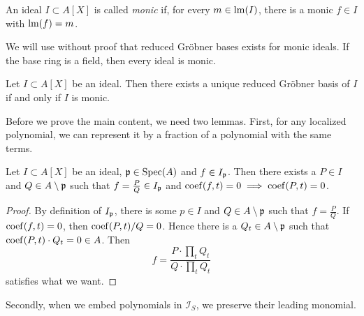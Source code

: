 \begin{definition}
  An ideal $I \subset A[X]$ is called \textit{monic} if, for every $m \in \operatorname{lm}(I)$, there is a monic $f \in I$ with $\operatorname{lm}(f) = m$.
\end{definition}

We will use without proof that reduced Gröbner bases exists for monic ideals. If the base ring is a field, then every ideal is monic.

\begin{proposition}\label{prop:exi!_red_grb}
  Let $I \subset A[X]$ be an ideal. Then there exists a unique reduced Gröbner basis of $I$ if and only if $I$ is monic.
\end{proposition}

Before we prove the main content, we need two lemmas. First, for any localized polynomial, we can represent it by a fraction of a polynomial with the same terms.

\begin{lemma}\label{lem:local_poly_rep}
  Let $I \subset A[X]$ be an ideal, $\mathfrak p \in \operatorname{Spec}(A)$ and $f \in I_{\mathfrak p}$. Then there exists a $P \in I$ and $Q \in A \setminus \mathfrak p$ such that $f = \frac P Q \in I_{\mathfrak p}$ and $\operatorname{coef}(f, t) = 0 \implies \operatorname{coef}(P, t) = 0$.
\end{lemma}
\begin{proof}
  By definition of $I_{\mathfrak p}$, there is some $p \in I$ and $Q \in A \setminus \mathfrak p$ such that $f = \frac P Q$. If $\operatorname{coef}(f, t) = 0$, then $\operatorname{coef}(P, t)/Q = 0$. Hence there is a $Q_{t} \in A \setminus \mathfrak p$ such that $\operatorname{coef}(P, t)\cdot Q_{t} = 0 \in A$. Then
  \[f = \frac{P \cdot \prod_{t}Q_{t}}{Q \cdot \prod_{t}Q_{t}}\] satisfies what we want.
\end{proof}

Secondly, when we embed polynomials in $\mathcal I_{S}$, we preserve their leading monomial.

